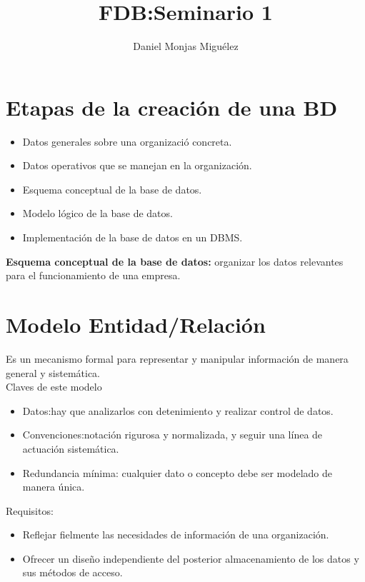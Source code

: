 \documentclass[a4paper,10pt]{article}
\title{FDB:Seminario 1 }
\author{Daniel Monjas Miguélez}
\begin{document}
\maketitle

\newpage

\tableofcontents

\newpage

\section{Etapas de la creación de una BD}
\begin{itemize}
\item Datos generales sobre una organizació concreta.

\item Datos operativos que se manejan en la organización.

\item Esquema conceptual de la base de datos.

\item Modelo lógico de la base de datos.

\item Implementación de la base de datos en un DBMS.
\end{itemize}

\textbf{Esquema conceptual de la base de datos:} organizar los datos relevantes para el funcionamiento de una empresa.

\section{Modelo Entidad/Relación}
Es un mecanismo formal para representar y manipular información de manera general y sistemática. \\

Claves de este modelo
\begin{itemize}
\item Datos:hay que analizarlos con detenimiento y realizar control de datos.

\item Convenciones:notación rigurosa y normalizada, y seguir una línea de actuación sistemática.

\item Redundancia mínima: cualquier dato o concepto debe ser modelado de manera única.
\end{itemize}

Requisitos:

\begin{itemize}
\item Reflejar fielmente las necesidades de información de una organización.

\item Ofrecer un diseño independiente del posterior almacenamiento de los datos y sus métodos de acceso.
\end{itemize}
\end{document}
